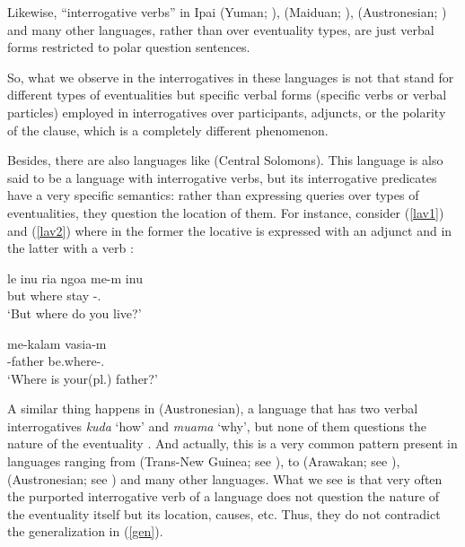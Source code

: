 \documentclass[output=paper]{langsci/langscibook}
\begin{document}

Likewise, ``interrogative verbs'' in Ipai (Yuman; \citealt{langdon1966}),
 (Maiduan; \citealt{shipley1964}),  (Austronesian;
\citealt{lindstrom.lynch1994}) and many other languages, rather than
 over eventuality types, are just verbal forms restricted to
polar question sentences.

So, what we observe in the interrogatives in these languages is not
 that stand for different types of eventualities but specific
verbal forms (specific verbs or verbal particles) employed in interrogatives
over participants, adjuncts, or the polarity of the clause, which is a
completely different phenomenon.

Besides, there are also languages like  (Central Solomons). This
language is also said to be a language with interrogative verbs, but its
interrogative predicates have a very specific semantics: rather than expressing
queries over types of eventualities, they question the location of them. For
instance, consider (\ref{lav1}) and (\ref{lav2}) where in the former the
locative is expressed with an adjunct and in the latter with a verb
\citep[from][457 and 460]{terrill2003}:

\begin{exe}
\ex \label{lav1} 
\sn\gll le inu ria ngoa me-m inu\\
but \Ssg{} where stay \Hab{}-\Sg.\M{} \Ssg{}\\
\glt `But where do you live?'

\ex \label{lav2} 
\sn\gll me-kalam vasia-m\\
\Spl{}-father be.where-\Sg.\M{}\\
\glt `Where is your(pl.) father?'
\end{exe}

A similar thing happens in  (Austronesian), a language that has two
verbal interrogatives \emph{kuda} `how' and \emph{muama} `why', but none of
them questions the nature of the eventuality \citep{teng2007}. And actually,
this is a very common pattern present in languages ranging from 
(Trans-New Guinea; see \citealt{huber2011}), to  (Arawakan; see
\citealt{guerreiroetal2010}),  (Austronesian; see
\citealt{huang1996}) and many other languages. What we see is that very often
the purported interrogative verb of a language does not question the nature of
the eventuality itself but its location, causes, etc. Thus, they do not
contradict the generalization in (\ref{gen}).
\end{document}
